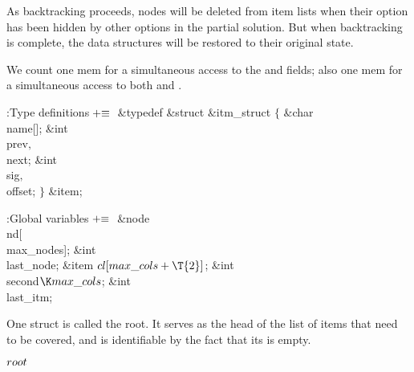 As backtracking proceeds, nodes
will be deleted from item lists when their option has been hidden by
other options in the partial solution.
But when backtracking is complete, the data structures will be
restored to their original state.

We count one mem for a simultaneous access to the  and  fields;
also one mem for a simultaneous access to both  and .

\Y\B\4:Type definitions\X${}\mathrel+\equiv{}$\6
\&{typedef} \&{struct} \&{itm\_struct} ${}\{{}$\1\6
\&{char} \\{name}[];\6
\&{int} \\{prev}${},{}$ \\{next};\6
\&{int} \\{sig}${},{}$ \\{offset};\2\6
${}\}{}$ \&{item};\par
\fi

\B{}:Global variables\X${}\mathrel+\equiv{}$\6
\&{node} \\{nd}[\\{max\_nodes}];\6
\&{int} \\{last\_node};\6
\&{item} ${}\\{cl}[\\{max\_cols}+\T{2}]{}$;\6
\&{int} \\{second}${}\K\\{max\_cols}{}$;\6
\&{int} \\{last\_itm};%
\par
\fi

One  struct is called the root. It serves as the head of the
list of items that need to be covered, and is identifiable by the fact
that its  is empty.

\Y\B\4\D$\\{root}$ \5
\par
\fi


